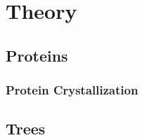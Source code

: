 \chapter{Theory} %

\label{chapter:theory} 

\section{Proteins}\label{sec:proteins}
\subsection{Protein Crystallization}\label{sec:proteins/protein_crystallization}

\section{Trees}\label{sec:trees}
